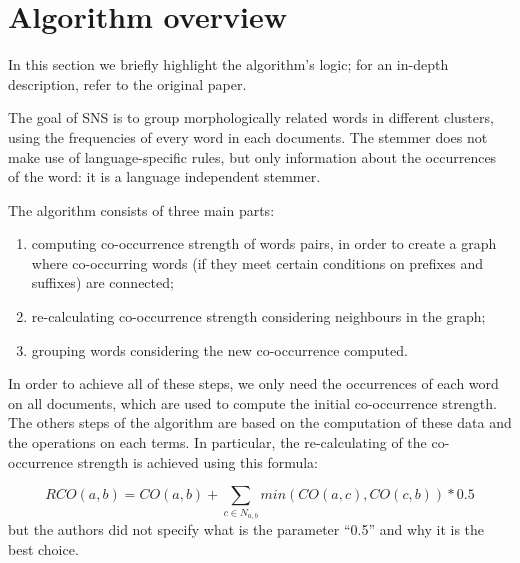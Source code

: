 \section{Algorithm overview}
    In this section we briefly highlight the algorithm's logic; for an in-depth description, refer to the original paper\cite{sns}.
 
    The goal of SNS is to group morphologically related words in different clusters, using the frequencies of every word in each documents. The stemmer does not make use of language-specific rules, but only information about the occurrences of the word: it is a language independent stemmer.
    
The algorithm consists of three main parts:

    \begin{enumerate}
        \item computing co-occurrence strength of words pairs, in order to create a graph where co-occurring words (if they meet certain conditions on prefixes and suffixes) are connected;
        \item re-calculating co-occurrence strength considering neighbours in the graph;
        \item grouping words considering the new co-occurrence computed.
    \end{enumerate}

    In order to achieve all of these steps, we only need the occurrences of each word on all documents, which are used to compute the initial co-occurrence strength. The others steps of the algorithm are based on the computation of these data and the operations on each terms. In particular, the re-calculating of the co-occurrence strength is achieved using this formula:
    
    \begin{equation}
		RCO(a,b) = CO(a,b) + \sum_{c \in N_{a,b}}min(CO(a,c), CO(c, b)) * 0.5    
    \end{equation}
but the authors did not specify what is the parameter ``0.5'' and why it is the best choice.